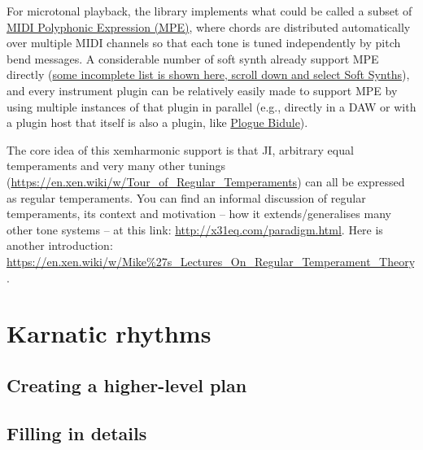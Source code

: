 \documentclass[11pt]{article}
\begin{document}
For microtonal playback, the library implements what could be called a subset of \href{https://www.midi.org/midi-articles/midi-polyphonic-expression-mpe}{MIDI Polyphonic
Expression (MPE)}, where chords are distributed automatically over multiple MIDI channels so that
each tone is tuned independently by pitch bend messages. A considerable number of soft synth
already support MPE directly (\href{https://roli.com/mpe}{some incomplete list is shown here, scroll down and select Soft
Synths}), and every instrument plugin can be relatively easily made to support MPE by
using multiple instances of that plugin in parallel (e.g., directly in a DAW or with a plugin
host that itself is also a plugin, like \href{https://www.plogue.com/products/bidule.html}{Plogue Bidule}).


The core idea of this xemharmonic support is that JI, arbitrary equal temperaments and very many
other tunings (\url{https://en.xen.wiki/w/Tour\_of\_Regular\_Temperaments}) can all be expressed as
regular temperaments. You can find an informal discussion of regular temperaments, its context
and motivation -- how it extends/generalises many other tone systems -- at this link:
\url{http://x31eq.com/paradigm.html}. Here is another introduction: \url{https://en.xen.wiki/w/Mike\%27s\_Lectures\_On\_Regular\_Temperament\_Theory}. 


\section{Karnatic rhythms}
\label{sec:orgcc2c5a7}

\subsection{Creating a higher-level plan}
\label{sec:orgb305b45}


\subsection{Filling in details}
\label{sec:orgc0a7c35}
\end{document}
